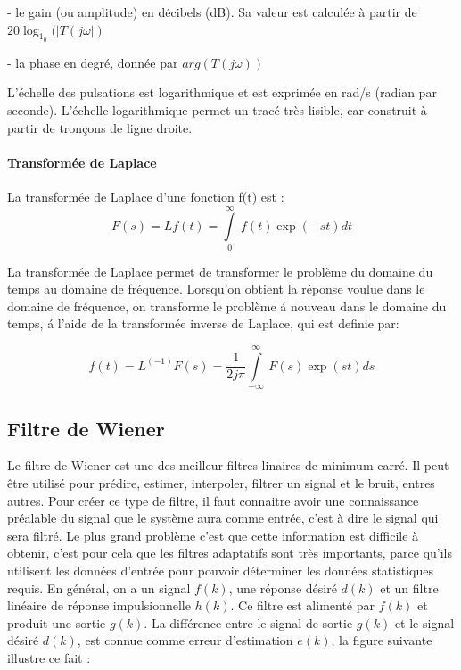 \documentclass[conference,onecolumn]{IEEEtran}
\begin{document}
- le gain (ou amplitude) en décibels (dB). Sa valeur est calculée à partir de $20\log_1_0(|T(j\omega|)$

- la phase en degré, donnée par $arg(T(j\omega))$

L'échelle des pulsations est logarithmique et est exprimée en rad/s (radian par seconde). L'échelle logarithmique permet un tracé très lisible, car construit à partir de tronçons de ligne droite.


\paragraph{Transformée de Laplace}
La transformée de Laplace d’une fonction f(t) est :
\begin{equation}
    F(s) = L{f(t)} = \int\limits_{0}^{\infty}\ f(t)\exp(-st) dt
\end{equation}

La transformée de Laplace permet de transformer le problème du domaine du temps au domaine de fréquence.
Lorsqu’on obtient la réponse voulue dans le domaine de fréquence, on transforme le problème á nouveau dans le domaine du temps, á l’aide de la transformée inverse de Laplace, qui est definie par:

\begin{equation}
    f(t) = L^(-1){F(s)} = \frac{1}{2j\pi} \int\limits_{-\infty}^{\infty} \ F(s)\exp(st) ds
\end{equation}

\subsection{\textbf{Filtre de Wiener}}
Le filtre de Wiener est une des meilleur filtres linaires de minimum carré. Il peut être utilisé pour prédire, estimer, interpoler, filtrer un signal et le bruit, entres autres. Pour créer ce type de filtre, il faut connaitre avoir une connaissance préalable du signal que le système aura comme entrée, c’est à dire le signal qui sera filtré. Le plus grand problème c’est que cette information est difficile à obtenir, c’est pour cela que les filtres adaptatifs sont très importants, parce qu’ils utilisent les données d’entrée pour pouvoir déterminer les données statistiques requis. En général, on a un signal $f(k)$, une réponse désiré $d(k)$ et un filtre linéaire de réponse impulsionnelle $h(k)$. Ce filtre est alimenté par $f(k)$ et produit une sortie $g(k)$. La différence entre le signal de sortie $g(k)$ et le signal désiré $d(k)$, est connue comme erreur d’estimation $e(k)$, la figure suivante illustre ce fait :
\end{document}
